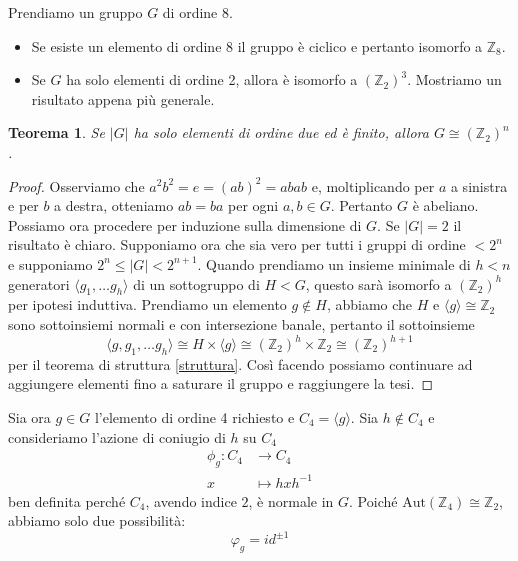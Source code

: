 \documentclass[a4paper]{article}
\newtheorem{theorem}{Teorema}[section]
\theoremstyle{remark}
\theoremstyle{definition}
\newcommand{\Aut}[1]{\mathrm{Aut}\left( #1 \right)}
\newcommand{\fun}[5]{\begin{align*}
	#1 \colon #2 &\to #3 \\
	#4 &\mapsto #5
	\end{align*}}
\begin{document}
\begin{multicols}{2}
	Prendiamo un gruppo $ G $ di ordine 8.
\begin{itemize}
	\item Se esiste un elemento di ordine 8 il gruppo è ciclico e pertanto isomorfo a $ \mathbb{Z}_8 $.
	\item Se $ G $ ha solo elementi di ordine 2, allora è isomorfo a $ \left(\mathbb{Z}_2\right)^3 $. Mostriamo un risultato appena più generale. 
\end{itemize}
\begin{theorem}
	Se $ |G| $ ha solo elementi di ordine due ed è finito, allora $ G \cong \left(\mathbb{Z}_2\right)^n $.
\end{theorem}
\begin{proof}
	Osserviamo che $ a^2b^2 = e = (ab)^2 = abab $ e, moltiplicando per $ a $ a sinistra e per $ b $ a destra, otteniamo $ ab = ba $ per ogni $ a, b \in G $. Pertanto $ G $ è abeliano. Possiamo ora procedere per induzione sulla dimensione di $ G $. Se $ |G| = 2 $ il risultato è chiaro. Supponiamo ora che sia vero per tutti i gruppi di ordine $ < 2^n $ e supponiamo $ 2^ n \leq |G| < 2^{n+1} $. Quando prendiamo un insieme minimale di $ h < n $ generatori $ \langle g_1, \dots g_h \rangle $ di un sottogruppo di $ H < G $, questo sarà isomorfo a $ \left(\mathbb{Z}_2\right)^h $ per ipotesi induttiva. Prendiamo un elemento $ g \notin H$, abbiamo che $ H $ e $ \langle g \rangle \cong \mathbb{Z}_2 $ sono sottoinsiemi normali e con intersezione banale, pertanto il sottoinsieme \[ \langle g, g_1, \dots g_h \rangle \cong H \times\langle g \rangle \cong \left(\mathbb{Z}_2\right)^h \times \mathbb{Z}_2 \cong \left(\mathbb{Z}_2\right)^{h+1} \]
	per il teorema di struttura \ref{struttura}.
	Così facendo possiamo continuare ad aggiungere elementi fino a saturare il gruppo e raggiungere la tesi.
\end{proof}
Sia ora $ g \in G $ l'elemento di ordine 4 richiesto e $ C_4 = \langle g \rangle $. Sia $ h \notin C_4 $ e consideriamo l'azione di coniugio di $ h $ su $ C_4 $
\fun{\phi_g}{C_4}{C_4}{x}{hxh^{-1}}
ben definita perché $ C_4 $, avendo indice $ 2 $, è normale in $ G $. Poiché $ \Aut{\mathbb{Z}_4} \cong \mathbb{Z}_2 $, abbiamo solo due possibilità: $$  \varphi_g =  id^{\pm 1}  $$


\end{multicols}
\end{document}
